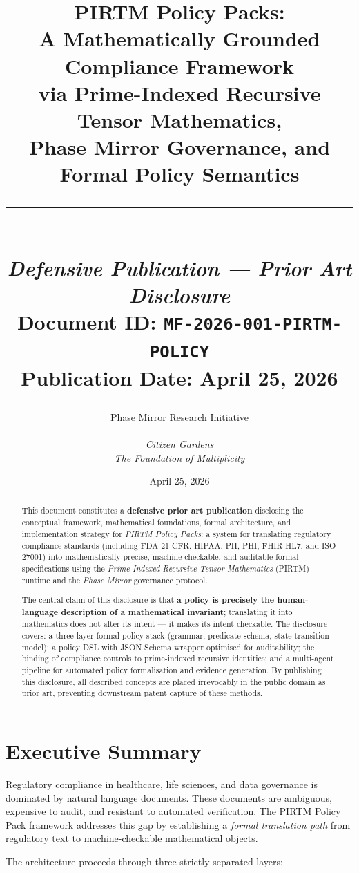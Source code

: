 \documentclass[12pt,letterpaper]{article}
\title{
  \vspace{-0.5in}
  {\LARGE \textbf{PIRTM Policy Packs:}} \\[6pt]
  {\large A Mathematically Grounded Compliance Framework} \\[4pt]
  {\large via Prime-Indexed Recursive Tensor Mathematics,} \\[2pt]
  {\large Phase Mirror Governance, and Formal Policy Semantics} \\[12pt]
  \rule{\textwidth}{0.5pt} \\[6pt]
  {\normalsize \textit{Defensive Publication --- Prior Art Disclosure}} \\[4pt]
  {\normalsize Document ID: \texttt{MF-2026-001-PIRTM-POLICY}} \\[2pt]
  {\normalsize Publication Date: April 25, 2026}
}
\author{
  Phase Mirror Research Initiative \\ \\
  \textit{Citizen Gardens} \\
  \textit{The Foundation of Multiplicity} \\[4pt]
}
\date{April 25, 2026}
\theoremstyle{definition}
\theoremstyle{plain}
\theoremstyle{remark}
\begin{document}
\maketitle
\thispagestyle{fancy}

\begin{abstract}
\noindent
This document constitutes a \textbf{defensive prior art publication} disclosing the
conceptual framework, mathematical foundations, formal architecture, and
implementation strategy for \emph{PIRTM Policy Packs}: a system for translating
regulatory compliance standards (including FDA 21 CFR, HIPAA, PII, PHI, FHIR HL7,
and ISO 27001) into mathematically precise, machine-checkable, and auditable
formal specifications using the \emph{Prime-Indexed Recursive Tensor Mathematics}
(PIRTM) runtime and the \emph{Phase Mirror} governance protocol.

The central claim of this disclosure is that \textbf{a policy is precisely the
human-language description of a mathematical invariant}; translating it into
mathematics does not alter its intent --- it makes its intent checkable. The
disclosure covers: a three-layer formal policy stack (grammar, predicate schema,
state-transition model); a policy DSL with JSON Schema wrapper optimised for
auditability; the binding of compliance controls to prime-indexed recursive
identities; and a multi-agent pipeline for automated policy formalisation and
evidence generation. By publishing this disclosure, all described concepts are
placed irrevocably in the public domain as prior art, preventing downstream
patent capture of these methods.
\end{abstract}

\tableofcontents
\newpage

\section{Executive Summary}
\label{sec:exec}

Regulatory compliance in healthcare, life sciences, and data governance is
dominated by natural language documents. These documents are ambiguous, expensive
to audit, and resistant to automated verification. The PIRTM Policy Pack
framework addresses this gap by establishing a \emph{formal translation path}
from regulatory text to machine-checkable mathematical objects.

The architecture proceeds through three strictly separated layers:
\end{document}
